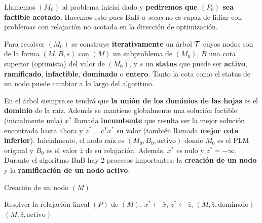    Llamemos $(M_0)$ al problema inicial dado y \textbf{pediremos que $(P_0)$ sea factible acotado}. Hacemos esto pues  BnB \emph{a secas} no es capaz de lidiar con problemas con relajación no acotada en la dirección de optimización.
    
    
    
    
    
    
    
    Para resolver $(M_0)$ se construye \textbf{iterativamente} un árbol $\mathcal T$ cuyos nodos son de la forma $(M,B,s)$ con $(M)$ un subproblema de $(M_0)$, $B$ una cota superior (optimista) del valor de $(M_0)$, y $s$ un \textbf{status} que puede ser \textbf{activo}, \textbf{ramificado}, \textbf{infactible}, \textbf{dominado} o \textbf{entero}. Tanto la cota como el status de un nodo puede cambiar a lo largo del algoritmo.
    
    En el árbol  siempre se tendrá que \textbf{la unión de los dominios de las hojas} es el \textbf{dominio} de la raíz. Además se mantiene globalmente una solución factible (inicialmente nula) $x^*$ llamada \textbf{incumbente} que resulta ser la mejor solución encontrada hasta ahora y $z^*=c^Tx^*$ su valor (también llamada \textbf{mejor cota inferior}).
    Inicialmente, el nodo raíz es $(M_0,B_0,\text{activo})$ donde $M_0$ es el PLM original y $B_0$ es el valor $\bar{z}$ de su relajación. Además, $x^*$ es nulo y $z^*=-\infty$. Durante el algoritmo BnB hay 2 procesos importantes: la \textbf{creación de un nodo} y la \textbf{ramificación de un nodo activo}.
    
    
    
    \begin{algorithm}[H]
    	\caption{Creación de un nodo $(M)$}
    	\label{alg:bnb}
    	\begin{algorithmic}[1] 
    		\State Resolver la relajación lineal $(P)$ de $(M)$.
    		  
    		\EndIf
    			 {} \EndIf
    			  {$x^*\gets \bar{x}$, $z^*\gets \bar{z}$,  }\EndIf
    		\EndIf
    			 {\Return $(M,\bar{z}, \text{dominado})$} \EndIf
    			 {\Return $(M,\bar{z}, \text{activo})$} \EndIf
    		\EndIf
    	
    	\end{algorithmic}
    \end{algorithm} 
    
